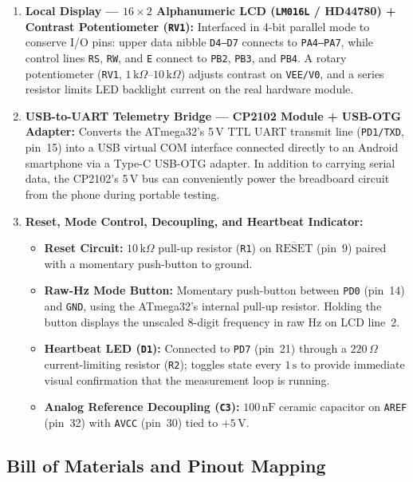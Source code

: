 \documentclass[11pt,a4paper]{article}
\begin{document}
\begin{enumerate}[leftmargin=1.5em]
    \item \textbf{Local Display --- $16\times 2$ Alphanumeric LCD (\texttt{LM016L} / HD44780) + Contrast Potentiometer (\texttt{RV1}):}
    Interfaced in 4-bit parallel mode to conserve I/O pins: upper data nibble \texttt{D4--D7} connects to \texttt{PA4--PA7}, while control lines \texttt{RS}, \texttt{RW}, and \texttt{E} connect to \texttt{PB2}, \texttt{PB3}, and \texttt{PB4}. A rotary potentiometer (\texttt{RV1}, $1\,\text{k}\Omega\text{--}10\,\text{k}\Omega$) adjusts contrast on \texttt{VEE/V0}, and a series resistor limits LED backlight current on the real hardware module.

    \item \textbf{USB-to-UART Telemetry Bridge --- CP2102 Module + USB-OTG Adapter:}
    Converts the ATmega32's 5\,V TTL UART transmit line (\texttt{PD1/TXD}, pin~15) into a USB virtual COM interface connected directly to an Android smartphone via a Type-C USB-OTG adapter. In addition to carrying serial data, the CP2102's 5\,V bus can conveniently power the breadboard circuit from the phone during portable testing.

    \item \textbf{Reset, Mode Control, Decoupling, and Heartbeat Indicator:}
    \begin{itemize}
        \item \textbf{Reset Circuit:} $10\,\text{k}\Omega$ pull-up resistor (\texttt{R1}) on $\overline{\text{RESET}}$ (pin~9) paired with a momentary push-button to ground.
        \item \textbf{Raw-Hz Mode Button:} Momentary push-button between \texttt{PD0} (pin~14) and \texttt{GND}, using the ATmega32's internal pull-up resistor. Holding the button displays the unscaled 8-digit frequency in raw Hz on LCD line~2.
        \item \textbf{Heartbeat LED (\texttt{D1}):} Connected to \texttt{PD7} (pin~21) through a $220\,\Omega$ current-limiting resistor (\texttt{R2}); toggles state every $1\,\text{s}$ to provide immediate visual confirmation that the measurement loop is running.
        \item \textbf{Analog Reference Decoupling (\texttt{C3}):} $100\,\text{nF}$ ceramic capacitor on \texttt{AREF} (pin~32) with \texttt{AVCC} (pin~30) tied to $+5\,\text{V}$.
    \end{itemize}
\end{enumerate}

\subsection{Bill of Materials and Pinout Mapping}
\end{document}
